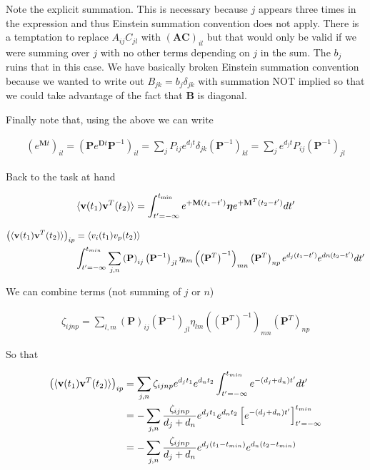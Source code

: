 \documentclass[12pt]{article}
\newcommand{\bv}[1]{\mathbf{#1}}
\begin{document}
Note the explicit summation. This is necessary because $j$ appears three times in the expression and thus Einstein summation convention does not apply. There is a temptation to replace $A_{ij}C_{jl}$ with $(\bv{A} \bv{C})_{il}$ but that would only be valid if we were summing over $j$ with no other terms depending on $j$ in the sum. The $b_j$ ruins that in this case. We have basically broken Einstein summation convention because we wanted to write out $B_{jk} = b_j \delta_{jk}$ with summation NOT implied so that we could take advantage of the fact that $\bv{B}$ is diagonal.

Finally note that, using the above we can write

\begin{align}
\left(e^{\bv{M}t}\right)_{il} = \left(\bv{P}e^{\bv{D}t}\bv{P}^{-1}\right)_{il} = \sum_{j} P_{ij}e^{d_j t} \delta_{jk}\left(\bv{P}^{-1}\right)_{kl} = \sum_j e^{d_j t} P_{ij} \left(\bv{P}^{-1}\right)_{jl}
\end{align}

Back to the task at hand

\begin{align}
\braket{\bv{v}(t_1)\bv{v}^T(t_2)} = \int_{t'=-\infty}^{t_{\text{min}}} e^{+\bv{M}(t_1-t')} \boldsymbol{\eta} e^{+\bv{M}^T (t_2-t')} dt'
\end{align}

\begin{align}
\left(\braket{\bv{v}(t_1)\bv{v}^T(t_2)}\right)_{ip}&= \braket{v_i(t_1)v_p(t_2)}\\
&\int_{t' = -\infty}^{t_{min}} \sum_{j,n} \left(\bv{P}\right)_{ij}\left(\bv{P}^{-1}\right)_{jl}\eta_{lm} \left(\left(\bv{P}^T\right)^{-1}\right)_{mn}\left(\bv{P}^{T}\right)_{np} e^{d_j (t_1-t')} e^{dn (t_2-t')} dt'
\end{align}

We can combine terms (not summing of $j$ or $n$)

\begin{align}
\zeta_{ijnp} = \sum_{l,m} \left(\bv{P}\right)_{ij}\left(\bv{P}^{-1}\right)_{jl}\eta_{lm} \left(\left(\bv{P}^T\right)^{-1}\right)_{mn}\left(\bv{P}^{T}\right)_{np}
\end{align}

So that

\begin{align}
\left(\braket{\bv{v}(t_1)\bv{v}^T(t_2)}\right)_{ip}&= \sum_{j,n} \zeta_{ijnp} e^{d_j t_1}e^{d_n t_2} \int_{t'=-\infty}^{t_{min}} e^{-(d_j+d_n)t'} dt'\\
&= -\sum_{j,n} \frac{\zeta_{ijnp}}{d_j+d_n} e^{d_j t_1} e^{d_n t_2} \left[e^{-(d_j+d_n)t'}\right]_{t'=-\infty}^{t_{min}}\\
&= -\sum_{j,n} \frac{\zeta_{ijnp}}{d_j+d_n} e^{d_j (t_1-t_{min})} e^{d_n (t_2-t_{min})}
\end{align}
\end{document}
